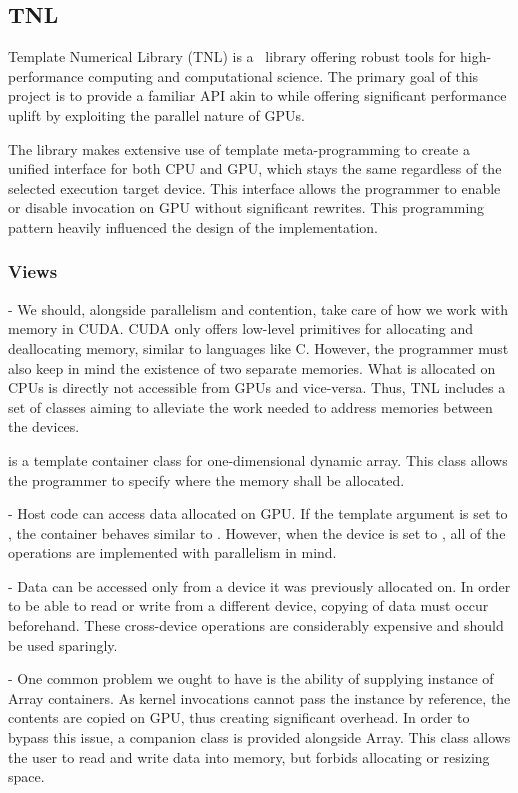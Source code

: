 \subsection{TNL}

Template Numerical Library (TNL) is a \CC\ library offering robust tools for high-performance computing and computational science. The primary goal of this project is to provide a familiar API akin to  while offering significant performance uplift by exploiting the parallel nature of GPUs.

The library makes extensive use of template meta-programming to create a unified interface for both CPU and GPU, which stays the same regardless of the selected execution target device. This interface allows the programmer to enable or disable invocation on GPU without significant rewrites. This programming pattern heavily influenced the design of the implementation.

\subsubsection{Views}

- We should, alongside parallelism and contention, take care of how we work with memory in CUDA. CUDA only offers low-level primitives for allocating and deallocating memory, similar to languages like C. However, the programmer must also keep in mind the existence of two separate memories. What is allocated on CPUs is directly not accessible from GPUs and vice-versa. Thus, TNL includes a set of classes aiming to alleviate the work needed to address memories between the devices.

 is a template container class for one-dimensional dynamic array. This class allows the programmer to specify where the memory shall be allocated.

- Host code can access data allocated on GPU. If the template argument is set to , the container behaves similar to . However, when the device is set to , all of the operations are implemented with parallelism in mind.

- Data can be accessed only from a device it was previously allocated on. In order to be able to read or write from a different device, copying of data must occur beforehand. These cross-device operations are considerably expensive and should be used sparingly.

- One common problem we ought to have is the ability of supplying instance of Array containers. As kernel invocations cannot pass the instance by reference, the contents are copied on GPU, thus creating significant overhead. In order to bypass this issue, a companion class  is provided alongside Array. This class allows the user to read and write data into memory, but forbids allocating or resizing space.